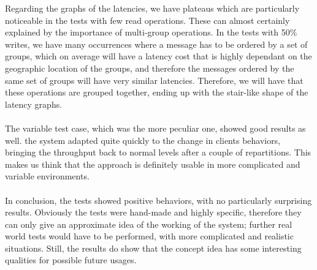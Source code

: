 Regarding the graphs of the latencies, we have plateaus which are particularly noticeable in the tests with few read operations. These can almost certainly explained by the importance of multi-group operations. In the tests with 50\% writes, we have many occurrences where a message has to be ordered by a set of groups, which on average will have a latency cost that is highly dependant on the geographic location of the groups, and therefore the messages ordered by the same set of groups will have very similar latencies. Therefore, we will have that these operations are grouped together, ending up with the stair-like shape of the latency graphs. 
\\\\
The variable test case, which was the more peculiar one, showed good results as well. the system adapted quite quickly to the change in clients behaviors, bringing the throughput back to normal levels after a couple of repartitions. This makes us think that the approach is definitely usable in more complicated and variable environments.
\\\\
In conclusion, the tests showed positive behaviors, with no particularly surprising results. Obviously the tests were hand-made and highly specific, therefore they can only give an approximate idea of the working of the system; further real world tests would have to be performed, with more complicated and realistic situations. Still, the results do show that the concept idea has some interesting qualities for possible future usages.



